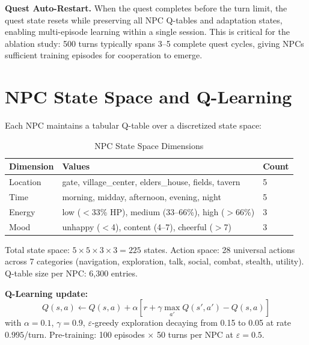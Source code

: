 \documentclass[12pt, a4paper, oneside]{report}
\begin{document}
\textbf{Quest Auto-Restart.} When the quest completes before the turn limit, the quest state resets while preserving all NPC Q-tables and adaptation states, enabling multi-episode learning within a single session. This is critical for the ablation study: 500 turns typically spans 3--5 complete quest cycles, giving NPCs sufficient training episodes for cooperation to emerge.

\section{NPC State Space and Q-Learning}
\label{sec:q-learning}

Each NPC maintains a tabular Q-table over a discretized state space:

\begin{table}[H]
\centering
\caption{NPC State Space Dimensions}
\label{tab:state_space}
\begin{tabular}{lll}
\toprule
\textbf{Dimension} & \textbf{Values} & \textbf{Count} \\
\midrule
Location & gate, village\_center, elders\_house, fields, tavern & 5 \\
Time & morning, midday, afternoon, evening, night & 5 \\
Energy & low ($<$33\% HP), medium (33--66\%), high ($>$66\%) & 3 \\
Mood & unhappy ($<$4), content (4--7), cheerful ($>$7) & 3 \\
\bottomrule
\end{tabular}
\end{table}

Total state space: $5 \times 5 \times 3 \times 3 = 225$ states. Action space: 28 universal actions across 7 categories (navigation, exploration, talk, social, combat, stealth, utility). Q-table size per NPC: 6,300 entries.

\textbf{Q-Learning update:}
\begin{equation}
    Q(s, a) \leftarrow Q(s, a) + \alpha \left[ r + \gamma \max_{a'} Q(s', a') - Q(s, a) \right]
\end{equation}
with $\alpha = 0.1$, $\gamma = 0.9$, $\varepsilon$-greedy exploration decaying from 0.15 to 0.05 at rate $0.995$/turn. Pre-training: 100 episodes $\times$ 50 turns per NPC at $\varepsilon = 0.5$.
\end{document}
